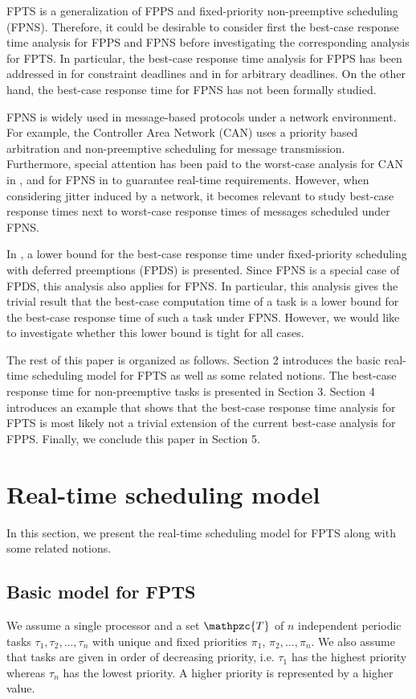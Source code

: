 \documentclass[conference,compsoc]{IEEEtran}
\begin{document}
FPTS is a generalization of FPPS and fixed-priority non-preemptive scheduling (FPNS). Therefore, it could be desirable to consider first the best-case response time analysis for FPPS and FPNS before investigating the corresponding analysis for FPTS. In particular, the best-case response time analysis for FPPS has been addressed in \cite{RS02} for constraint deadlines and in \cite{BLM13} for arbitrary deadlines. On the other hand, the best-case response time for FPNS has not been formally studied. 

FPNS is widely used in message-based protocols under a network environment. For example, the Controller Area Network (CAN) uses a priority based arbitration and non-preemptive scheduling for message transmission. Furthermore, special attention has been paid to the worst-case analysis for CAN in \cite{DBBL07}, and for FPNS in \cite{BLV09} to guarantee real-time requirements. However, when considering jitter induced by a network, it becomes relevant to study best-case response times next to worst-case response times of messages scheduled under FPNS.

In \cite{BV05}, a lower bound for the best-case response time under fixed-priority scheduling with deferred preemptions (FPDS) is presented. Since FPNS is a special case of FPDS, this analysis also applies for FPNS. In particular, this analysis gives the trivial result that the best-case computation time of a task is a lower bound for the best-case response time of such a task under FPNS. However, we would like to investigate whether this lower bound is tight for all cases.

The rest of this paper is organized as follows. Section 2 introduces the basic real-time scheduling model for FPTS as well as some related notions. The best-case response time for non-preemptive tasks is presented in Section 3. Section 4 introduces an example that shows that the best-case response time analysis for FPTS is most likely not a trivial extension of the current best-case analysis for FPPS. Finally, we conclude this paper in Section 5.

\section{Real-time scheduling model}
In this section, we present the real-time scheduling model for FPTS along with some related notions.

\subsection{Basic model for FPTS}
We assume a single processor and a set $\mathpzc{T}$ of $n$ independent periodic tasks $\tau_1,\tau_2,...,\tau_n$ with unique and fixed priorities $\pi_{1}$, $\pi_{2},...,\pi_{n}$. We also assume that tasks are given in order of decreasing priority, i.e. $\tau_1$ has the highest priority whereas $\tau_n$ has the lowest priority. A higher priority is represented by a higher value.
\end{document}
